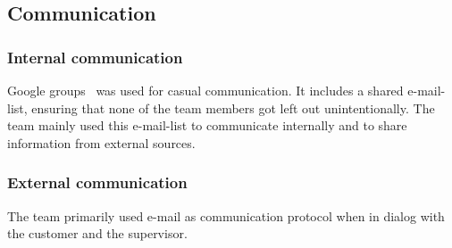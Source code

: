 \subsection{Communication}
\subsubsection{Internal communication}
Google groups~\cite{ggroups} was used for casual communication. It includes a shared e-mail-list, ensuring that none of the team members got left out unintentionally. The team mainly used this e-mail-list to communicate internally and to share information from external sources. 

\subsubsection{External communication}
The team primarily used e-mail as communication protocol when in dialog with the customer and the supervisor.